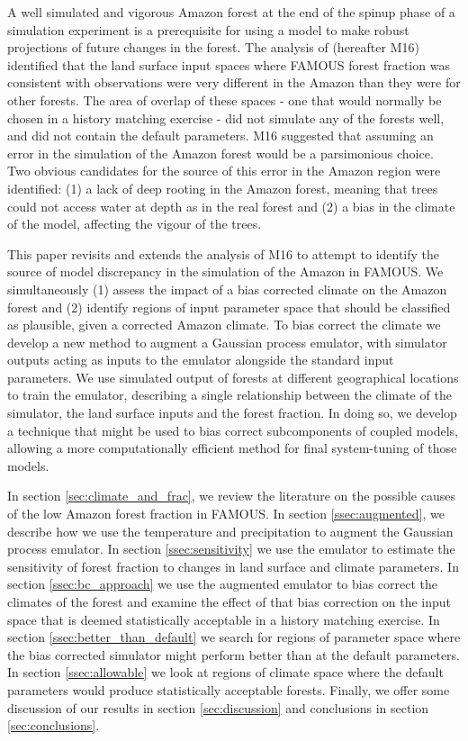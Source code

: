 \documentclass[gmd, manuscript]{copernicus}
\begin{document}
A well simulated and vigorous Amazon forest at the end of the spinup phase of a simulation experiment is a prerequisite for using a model to make robust projections of future changes in the forest. The analysis of \cite{mcneall2016impact} (hereafter M16) identified that the land surface input spaces where FAMOUS forest fraction was consistent with observations were very different in the Amazon than they were for other forests. The area of overlap of these spaces - one that would normally be chosen in a history matching exercise - did not simulate any of the forests well, and did not contain the default parameters. M16 suggested that assuming an error in the simulation of the Amazon forest would be a parsimonious choice. Two obvious candidates for the source of this error in the Amazon region were identified: (1) a lack of deep rooting in the Amazon forest, meaning that trees could not access water at depth as in the real forest and (2) a bias in the climate of the model, affecting the vigour of the trees.

This paper revisits and extends the analysis of M16 to attempt to identify the source of model discrepancy in the simulation of the Amazon in FAMOUS. We simultaneously (1) assess the impact of a bias corrected climate on the Amazon forest and (2) identify regions of input parameter space that should be classified as plausible, given a corrected Amazon climate. To bias correct the climate we develop a new method to augment a Gaussian process emulator, with simulator outputs acting as inputs to the emulator alongside the standard input parameters.  We use simulated output of forests at different geographical locations to train the emulator, describing a single relationship between the climate of the simulator, the land surface inputs and the forest fraction. In doing so, we develop a technique that might be used to bias correct subcomponents of coupled models, allowing a more computationally efficient method for final system-tuning of those models. 

In section \ref{sec:climate_and_frac}, we review the literature on the possible causes of the low Amazon forest fraction in FAMOUS. In section \ref{ssec:augmented}, we describe how we use the temperature and precipitation to augment the Gaussian process emulator. In section \ref{ssec:sensitivity} we use the emulator to estimate the sensitivity of forest fraction to changes in land surface and climate parameters. In section \ref{ssec:bc_approach} we use the augmented emulator to bias correct the climates of the forest and examine the effect of that bias correction on the input space that is deemed statistically acceptable in a history matching exercise. In section \ref{ssec:better_than_default} we search for regions of parameter space where the bias corrected simulator might perform better than at the default parameters. In section \ref{ssec:allowable} we look at regions of climate space where the default parameters would produce statistically acceptable forests. Finally, we offer some discussion of our results in section \ref{sec:discussion} and conclusions in section \ref{sec:conclusions}.
\end{document}
